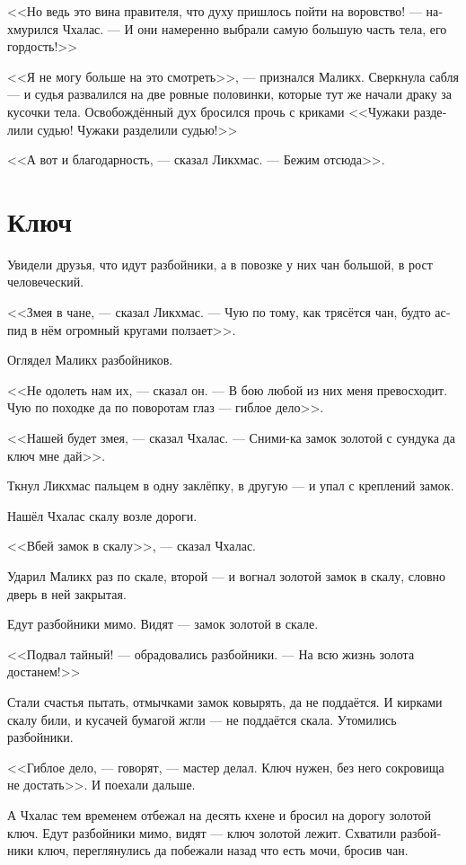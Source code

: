 \documentclass[a4paper,12pt,fleqn]{book}\usepackage{polyglossia}\setdefaultlanguage[babelshorthands=true]{russian}\setotherlanguage{english}\defaultfontfeatures{Ligatures=TeX,Mapping=tex-text}\usepackage{xcolor}\newcommand{\ml}[3]{#2}
\begin{document}
{<<Но ведь это вина правителя, что духу пришлось пойти на воровство! --- нахмурился Чхалас.
--- И они намеренно выбрали самую большую часть тела, его гордость!>>

<<Я не могу больше на это смотреть>>, --- признался Маликх.
Сверкнула сабля --- и судья развалился на две ровные половинки, которые тут же начали драку за кусочки тела.
Освобождённый дух бросился прочь с криками <<Чужаки разделили судью! Чужаки разделили судью!>>

<<А вот и благодарность, --- сказал Ликхмас.
--- Бежим отсюда>>.

\section{Ключ}

Увидели друзья, что идут разбойники, а в повозке у них чан большой, в рост человеческий.

<<Змея в чане, --- сказал Ликхмас.
--- Чую по тому, как трясётся чан, будто аспид в нём огромный кругами ползает>>.

Оглядел Маликх разбойников.

<<Не одолеть нам их, --- сказал он.
--- В бою любой из них меня превосходит.
Чую по походке да по поворотам глаз --- гиблое дело>>.

<<Нашей будет змея, --- сказал Чхалас.
--- Сними-ка замок золотой с сундука да ключ мне дай>>.

Ткнул Ликхмас пальцем в одну заклёпку, в другую --- и упал с креплений замок.

Нашёл Чхалас скалу возле дороги.

<<Вбей замок в скалу>>, --- сказал Чхалас.

Ударил Маликх раз по скале, второй --- и вогнал золотой замок в скалу, словно дверь в ней закрытая.

Едут разбойники мимо.
Видят --- замок золотой в скале.

<<Подвал тайный! --- обрадовались разбойники.
--- На всю жизнь золота достанем!>>

Стали счастья пытать, отмычками замок ковырять, да не поддаётся.
И кирками скалу били, и кусачей бумагой жгли --- не поддаётся скала.
Утомились разбойники.

<<Гиблое дело, --- говорят, --- мастер делал.
Ключ нужен, без него сокровища не достать>>.
И поехали дальше.

А Чхалас тем временем отбежал на десять кхене и бросил на дорогу золотой ключ.
Едут разбойники мимо, видят --- ключ золотой лежит.
Схватили разбойники ключ, переглянулись да побежали назад что есть мочи, бросив чан.

}
\end{document}
